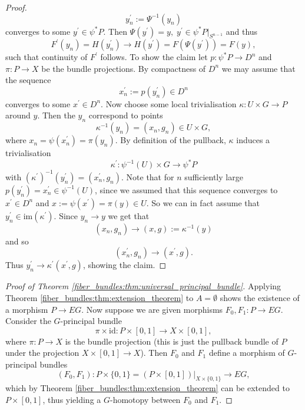 \begin{proof}
    \[
    y_n^\prime := \Psi^{-1}(y_n)
    \]
    converges to some $y^\prime \in \psi^\ast P$. Then $\Psi(y^\prime) = y, \; y^\prime \in \psi^\ast P|_{S^{n-1}}$ and thus 
    \[
    F^\prime(y_n) = H(y_n^\prime) \longrightarrow H(y^\prime) = F(\Psi(y^\prime)) = F(y),
    \]
    such that continuity of $F^\prime$ follows. To show the claim let $p \colon \psi^\ast P \to D^n$ and $\pi \colon P \to X$ be the bundle projections. By compactness of $D^n$ we may assume that the sequence 
    \[
    x_n^\prime := p(y_n^\prime) \in D^n
    \]
    converges to some $x^\prime \in D^n$. Now choose some local trivialisation $\kappa \colon U \times G \to P$ around $y$. Then the $y_n$ correspond to points 
    \[
    \kappa^{-1}(y_n) = (x_n,g_n) \in U \times G,
    \]
    where $x_n = \psi(x_n^\prime) = \pi(y_n)$. By definition of the pullback, $\kappa$ induces a trivialisation 
    \[
    \kappa^\prime \colon \psi^{-1}(U) \times G \to \psi^\ast P
    \]
    with $(\kappa^\prime)^{-1}(y_n^\prime) = (x_n^\prime,g_n)$. Note that for $n$ sufficiently large $p(y_n^\prime) = x_n^\prime \in \psi^{-1}(U)$, since we assumed that this sequence converges to $x^\prime \in D^n$ and $x := \psi(x^\prime) = \pi(y) \in U$. So we can in fact assume that $y_n^\prime \in \mathrm{im}(\kappa^\prime)$. Since $y_n \longrightarrow y$ we get that 
    \[
    (x_n,g_n) \longrightarrow (x,g) := \kappa^{-1}(y)
    \]
    and so 
    \[
    (x_n^\prime,g_n) \longrightarrow (x^\prime,g).
    \]
    Thus $y_n^\prime \longrightarrow \kappa^\prime(x^\prime,g)$, showing the claim.
\end{proof}

\begin{proof}[Proof of Theorem \ref{fiber_bundles:thm:universal_principal_bundle}]
    Applying Theorem \ref{fiber_bundles:thm:extension_theorem} to $A = \emptyset$ shows the existence of a morphism $P \to EG$. Now suppose we are given morphisms $F_0,F_1 \colon P \to EG$. Consider the $G$-principal bundle 
    \[
    \pi \times \mathrm{id} \colon P \times [0,1] \to X \times [0,1],
    \]
    where $\pi \colon P \to X$ is the bundle projection (this is just the pullback bundle of $P$ under the projection $X \times [0,1] \to X$). Then $F_0$ and $F_1$ define a morphism of $G$-principal bundles 
    \[
    (F_0,F_1) \colon P \times \{0,1\} = (P \times [0,1])|_{X \times \{0,1\}}\to EG,
    \]
    which by Theorem \ref{fiber_bundles:thm:extension_theorem} can be extended to $P \times [0,1]$, thus yielding a $G$-homotopy between $F_0$ and $F_1$.
\end{proof}

